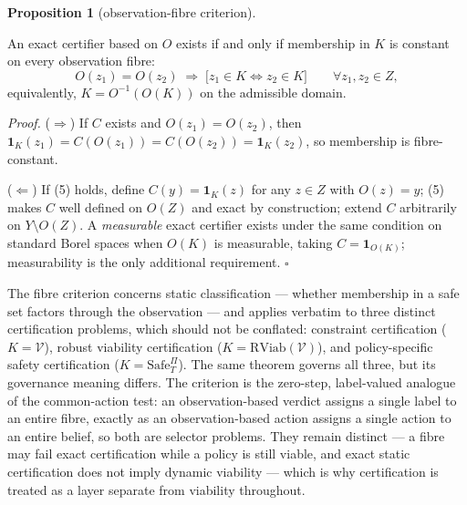 \documentclass[11pt]{article}
\theoremstyle{definition}
\newtheorem{proposition}{Proposition}
\begin{document}
\begin{proposition}[observation-fibre criterion]\label{prop:fibre}

An exact certifier
based on \(O\) exists if and only if membership in \(K\) is constant on
every observation fibre:
\[O(z_1) = O(z_2) \;\Longrightarrow\; \big[ z_1 \in K \iff z_2 \in K \big] \qquad \forall z_1, z_2 \in Z, \tag{5}\]
equivalently, \(K = O^{-1}(O(K))\) on the admissible domain.

\end{proposition}

\emph{Proof.} (\(\Rightarrow\)) If \(C\) exists and \(O(z_1) = O(z_2)\),
then \(\mathbf{1}_K(z_1) = C(O(z_1)) = C(O(z_2)) = \mathbf{1}_K(z_2)\),
so membership is fibre-constant.

(\(\Leftarrow\)) If (5) holds, define \(C(y) = \mathbf{1}_K(z)\) for any
\(z \in Z\) with \(O(z) = y\); (5) makes \(C\) well defined on \(O(Z)\)
and exact by construction; extend \(C\) arbitrarily on
\(Y \setminus O(Z)\). A \emph{measurable} exact certifier exists under
the same condition on standard Borel spaces when \(O(K)\) is measurable,
taking \(C = \mathbf{1}_{O(K)}\); measurability is the only additional requirement. \ensuremath{\square}

The fibre criterion concerns static classification --- whether
membership in a safe set factors through the observation --- and applies
verbatim to three distinct certification problems, which should not be
conflated: constraint certification (\(K = \mathcal{V}\)), robust
viability certification (\(K = \mathrm{RViab}(\mathcal{V})\)), and
policy-specific safety certification (\(K = \mathrm{Safe}^{\Pi}_T\)).
The same theorem governs all three, but its governance meaning differs.
The criterion is the zero-step, label-valued analogue of the
common-action test: an observation-based verdict assigns a single label
to an entire fibre, exactly as an observation-based action assigns a
single action to an entire belief, so both are selector problems. They
remain distinct --- a fibre may fail exact certification while a policy
is still viable, and exact static certification does not imply dynamic
viability --- which is why certification is treated as a layer separate
from viability throughout.
\end{document}
